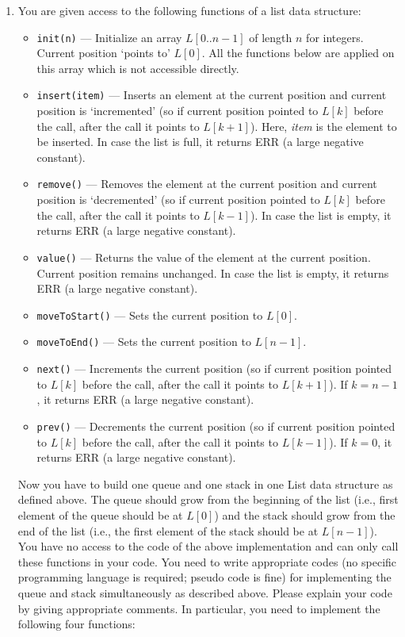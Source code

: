 \documentclass[12pt,a3paper]{article}
\begin{document}
\begin{enumerate}
\item You are given access to the following functions of a list data structure:
\begin{itemize}
  \item \texttt{init(n)} --- Initialize an array $L[0..n-1]$ of length $n$ for integers. Current position `points to' $L[0]$. All the functions below are applied on this array which is not accessible directly.
  \item \texttt{insert(item)} --- Inserts an element at the current position and current position is `incremented' (so if current position pointed to $L[k]$ before the call, after the call it points to $L[k+1]$). Here, \textit{item} is the element to be inserted. In case the list is full, it returns ERR (a large negative constant).
  \item \texttt{remove()} --- Removes the element at the current position and current position is `decremented' (so if current position pointed to $L[k]$ before the call, after the call it points to $L[k-1]$). In case the list is empty, it returns ERR (a large negative constant).
  \item \texttt{value()} --- Returns the value of the element at the current position. Current position remains unchanged. In case the list is empty, it returns ERR (a large negative constant).
  \item \texttt{moveToStart()} --- Sets the current position to $L[0]$.
  \item \texttt{moveToEnd()} --- Sets the current position to $L[n-1]$.
  \item \texttt{next()} --- Increments the current position (so if current position pointed to $L[k]$ before the call, after the call it points to $L[k+1]$). If $k = n-1$, it returns ERR (a large negative constant).
  \item \texttt{prev()} --- Decrements the current position (so if current position pointed to $L[k]$ before the call, after the call it points to $L[k-1]$). If $k = 0$, it returns ERR (a large negative constant).
\end{itemize}
Now you have to build one queue and one stack in one List data structure as defined above. The queue should grow from the beginning of the list (i.e., first element of the queue should be at $L[0]$) and the stack should grow from the end of the list (i.e., the first element of the stack should be at $L[n-1]$). You have no access to the code of the above implementation and can only call these functions in your code. You need to write appropriate codes (no specific programming language is required; pseudo code is fine) for implementing the queue and stack simultaneously as described above. Please explain your code by giving appropriate comments. In particular, you need to implement the following four functions:

\end{enumerate}
\end{document}
